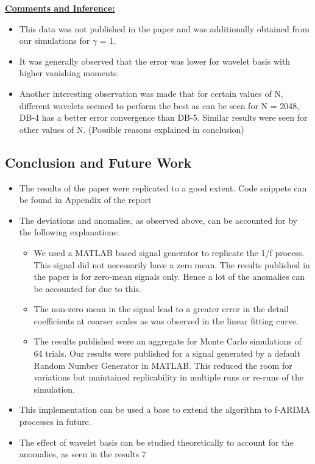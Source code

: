 \documentclass[a4paper]{article}
\begin{document}
\underline{\textbf{Comments and Inference:}}
\begin{itemize}
\item This data was not published in the paper and was additionally obtained from our simulations for $\gamma$ = 1.
\item It was generally observed that the error was lower for wavelet basis with higher vanishing moments.
\item Another interesting observation was made that for certain values of N, different wavelets seemed to perform the best as can be seen for N = 2048, DB-4 has a better error convergence than DB-5. Similar results were seen for other values of N. (Possible reasons explained in conclusion)
\end{itemize}

\subsection{Conclusion and Future Work}
\begin{itemize}
\item The results of the paper were replicated to a good extent. Code snippets can be found in Appendix of the report
\item The deviations and anomalies, as observed above, can be accounted for by the following explanations:
\begin{itemize}
\item We used a MATLAB based signal generator to replicate the 1/f process. This signal did not necessarily have a zero mean. The results published in the paper is for zero-mean signals only. Hence a lot of the anomalies can be accounted for due to this.
\item The non-zero mean in the signal lead to a greater error in the detail coefficients at coarser scales as was observed in the linear fitting curve.
\item The results published were an aggregate for Monte Carlo simulations of 64 trials. Our results were published for a signal generated by a  default Random Number Generator in MATLAB. This reduced the room for variations but maintained replicability in multiple runs or re-runs of the simulation.
\end{itemize}
\item This implementation can be used a base to extend the algorithm to f-ARIMA processes in future.
\item The effect of wavelet basis can be studied theoretically to account for the anomalies, as seen in the results 7
\end{itemize}



\end{document}
